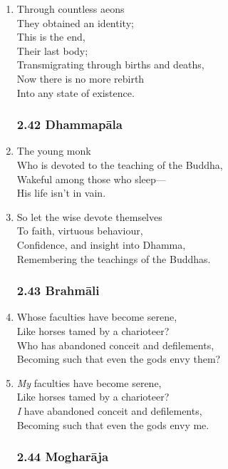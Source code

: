 \documentclass[10pt, openany]{book}
\begin{document}
\begin{enumerate}
\item Through countless aeons\\
They obtained an identity;\\
This is the end,\\
Their last body;\\
Transmigrating through births and deaths,\\
Now there is no more rebirth \\
Into any state of existence.

\subsubsection*{2.42 Dhammapāla}

\item The young monk\\
Who is devoted to the teaching of the Buddha,\\
Wakeful among those who sleep—\\
His life isn’t in vain.

\item So let the wise devote themselves\\
To faith, virtuous behaviour,\\
Confidence, and insight into Dhamma,\\
Remembering the teachings of the Buddhas.

\subsubsection*{2.43 Brahmāli}

\item Whose faculties have become serene,\\
Like horses tamed by a charioteer?\\
Who has abandoned conceit and defilements,\\
Becoming such that even the gods envy them?

\item \emph{My} faculties have become serene,\\
Like horses tamed by a charioteer?\\
\emph{I} have abandoned conceit and defilements,\\
Becoming such that even the gods envy me.

\subsubsection*{2.44 Mogharāja}


\end{enumerate}
\end{document}
